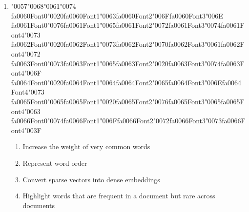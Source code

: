 \documentclass[12pt]{article}
\begin{document}
\begin{enumerate}[label=Q\arabic*.]
\item {\char"0057}{\char"0068}{\char"0061}{\char"0074} {\csname fa0060Font0\endcsname\char"0020}{\csname fa0060Font1\endcsname\char"0063}{\csname fa0060Font2\endcsname\char"006F}{\csname fa0060Font3\endcsname\char"006E} {\csname fa0061Font0\endcsname\char"0076}{\csname fa0061Font1\endcsname\char"0065}{\csname fa0061Font2\endcsname\char"0072}{\csname fa0061Font3\endcsname\char"0074}{\csname fa0061Font4\endcsname\char"0073} {\csname fa0062Font0\endcsname\char"0020}{\csname fa0062Font1\endcsname\char"0073}{\csname fa0062Font2\endcsname\char"0070}{\csname fa0062Font3\endcsname\char"0061}{\csname fa0062Font4\endcsname\char"0072} {\csname fa0063Font0\endcsname\char"0073}{\csname fa0063Font1\endcsname\char"0065}{\csname fa0063Font2\endcsname\char"0020}{\csname fa0063Font3\endcsname\char"0074}{\csname fa0063Font4\endcsname\char"006F} {\csname fa0064Font0\endcsname\char"0020}{\csname fa0064Font1\endcsname\char"0064}{\csname fa0064Font2\endcsname\char"0065}{\csname fa0064Font3\endcsname\char"006E}{\csname fa0064Font4\endcsname\char"0073} {\csname fa0065Font0\endcsname\char"0065}{\csname fa0065Font1\endcsname\char"0020}{\csname fa0065Font2\endcsname\char"0076}{\csname fa0065Font3\endcsname\char"0065}{\csname fa0065Font4\endcsname\char"0063} {\csname fa0066Font0\endcsname\char"0074}{\csname fa0066Font1\endcsname\char"006F}{\csname fa0066Font2\endcsname\char"0072}{\csname fa0066Font3\endcsname\char"0073}{\csname fa0066Font4\endcsname\char"003F}
\begin{enumerate}[label=(\Alph*)]
    \item Increase the weight of very common words
    \item Represent word order
    \item Convert sparse vectors into dense embeddings
    \item Highlight words that are frequent in a document but rare across documents
\end{enumerate}

\end{enumerate}
\end{document}
